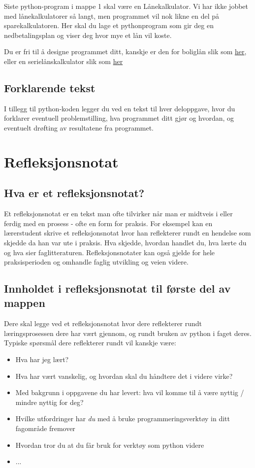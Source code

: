 \documentclass[12pt, titlepage]{article}
\begin{document}
Siste python-program i mappe 1 skal være en Lånekalkulator. Vi har ikke jobbet med lånekalkulatorer så langt, men programmet vil nok likne en del på sparekalkulatoren.
Her skal du lage et pythonprogram som gir deg en nedbetalingsplan og viser deg hvor mye et lån vil koste.

Du er fri til å designe programmet ditt, kanskje er den for boliglån slik som \href{https://www.nordea.no/privat/vare-produkter/lan-og-kreditt/boliglan/hva-koster-boliglanet.html#/}{her}, eller en serielånskalkulator slik som \href{https://www.smartepenger.no/kalkulatorer/978-serielanskalkulator}{her}

\subsection*{Forklarende tekst}

I tillegg til python-koden legger du ved en tekst til hver deloppgave, hvor du forklarer eventuell problemstilling, hva programmet ditt gjør og hvordan, og eventuelt drøfting av resultatene fra programmet.

\section*{Refleksjonsnotat}

\subsection*{Hva er et refleksjonsnotat?}

Et refleksjonsnotat er en tekst man ofte tilvirker når man er midtveis i eller ferdig med en prosess - ofte en form for praksis.
For eksempel kan en lærerstudent skrive et refleksjonsnotat hvor han reflekterer rundt en hendelse som skjedde da han var ute i praksis.
Hva skjedde, hvordan handlet du, hva lærte du og hva sier faglitteraturen. Refleksjonsnotater kan også gjelde for hele praksisperioden og omhandle faglig utvikling og veien videre.

\subsection*{Innholdet i refleksjonsnotat til første del av mappen}

Dere skal legge ved et refleksjonsnotat hvor dere reflekterer rundt læringsprosessen dere har vært gjennom, og rundt bruken av python i faget deres.
Typiske spørsmål dere reflekterer rundt vil kanskje være:
\begin{itemize}
   \item {Hva har jeg lært?}
   \item {Hva har vært vanskelig, og hvordan skal du håndtere det i videre virke?}
   \item {Med bakgrunn i oppgavene du har levert: hva vil komme til å være nyttig / mindre nyttig for deg?}
   \item {Hvilke utfordringer har \textit{du} med å bruke programmeringsverktøy in ditt fagområde fremover}
   \item {Hvordan tror du at du får bruk for verktøy som python videre}
   \item { ... }
\end{itemize}
\end{document}
